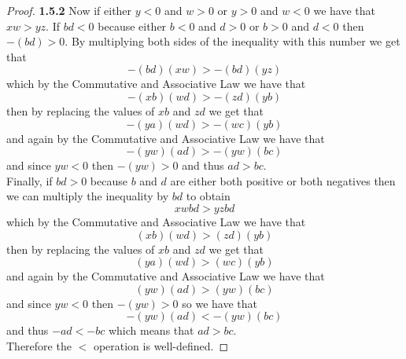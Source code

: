 \documentclass[11pt]{article}
\theoremstyle{definition}
\begin{document}
\begin{proof}{\textbf{1.5.2}}
        Now if either $y<0$ and $w>0$ or $y>0$ and $w<0$ we have that $xw>yz$.
        If $bd < 0$ because either $b<0$ and $d>0$ or $b>0$ and $d<0$ then $-(bd)>0$.
        By multiplying both sides of the inequality with this number we get that 
        $$-(bd)(xw)>-(bd)(yz)$$
        which by the Commutative and Associative Law we have that
        $$-(xb)(wd)>-(zd)(yb)$$
        then by replacing the values of $xb$ and $zd$ we get that
        $$-(ya)(wd)>-(wc)(yb)$$
        and again by the Commutative and Associative Law we have that
        $$-(yw)(ad)>-(yw)(bc)$$
        and since $yw<0$ then $-(yw)>0$ and thus $ad>bc$.\\
        Finally, if $bd > 0$ because $b$ and $d$ are either both positive or
        both negatives then we can multiply the inequality by $bd$ to obtain
        $$xwbd>yzbd$$
        which by the Commutative and Associative Law we have that
        $$(xb)(wd)>(zd)(yb)$$
        then by replacing the values of $xb$ and $zd$ we get that
        $$(ya)(wd)>(wc)(yb)$$
        and again by the Commutative and Associative Law we have that
        $$(yw)(ad)>(yw)(bc)$$
        and since $yw<0$ then $-(yw)>0$ so we have that 
        $$-(yw)(ad)<-(yw)(bc)$$
        and thus $-ad<-bc$ which means that $ad>bc$.\\
        Therefore the $<$ operation is well-defined.
    \end{proof}
\cleardoublepage
\end{document}
